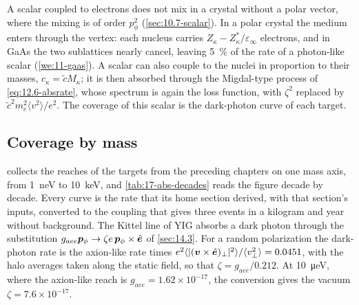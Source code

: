 A scalar coupled to electrons does not mix in a crystal without a polar vector, where the mixing is of order $p_\phi^2$ (\cref{sec:10.7-scalar}). In a polar crystal the medium enters through the vertex: each nucleus carries $Z_\kappa - Z^*_\kappa/\varepsilon_\infty$ electrons, and in GaAs the two sublattices nearly cancel, leaving \SI{5}{\percent} of the rate of a photon-like scalar (\cref{we:11-gaas}). A scalar can also couple to the nuclei in proportion to their masses, $c_\kappa = \tilde cM_\kappa$; it is then absorbed through the Migdal-type process of \cref{eq:12.6-absrate}, whose spectrum is again the loss function, with $\zeta^2$ replaced by $\tilde c^2m_e^2\langle v^2\rangle/e^2$. The coverage of this scalar is the dark-photon curve of each target.

\subsection{Coverage by mass}\label{sec:17.2-coverage}

 collects the reaches of the targets from the preceding chapters on one mass axis, from \SI{1}{neV} to \SI{10}{keV}, and \cref{tab:17-abs-decades} reads the figure decade by decade. Every curve is the rate that its home section derived, with that section's inputs, converted to the coupling that gives three events in a kilogram and year without background. The Kittel line of YIG absorbs a dark photon through the substitution $g_{aee}\bm{p}_\phi \to \zeta e\,\bm{p}_\phi\times\hat{\bm{e}}$ of \cref{sec:14.3}. For a random polarization the dark-photon rate is the axion-like rate times $e^2\langle|(\bm{v}\times\hat{\bm{e}})_\perp|^2\rangle/\langle v_\perp^2\rangle = 0.0451$, with the halo averages taken along the static field, so that $\zeta = g_{aee}/0.212$. At \SI{10}{\micro eV}, where the axion-like reach is $g_{aee} = 1.62\times10^{-17}$, the conversion gives the vacuum $\zeta = 7.6\times10^{-17}$.

